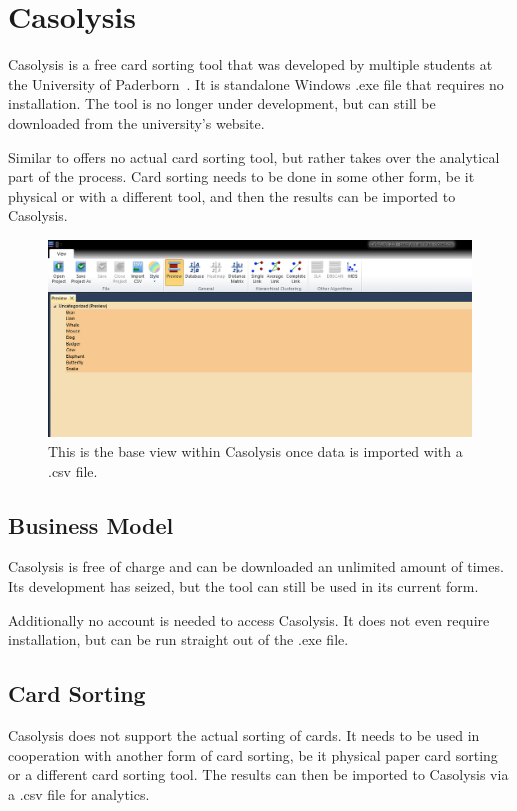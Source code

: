 \chapter{Casolysis}

\label{chap:Casolysis}

Casolysis is a free card sorting tool that was developed by multiple
students at the University of Paderborn~\parencite{Casolysis}. It is
standalone Windows .exe file that requires no installation. The tool 
is no longer under development, but can still be downloaded from the 
university's website.

Similar to \textcite{SynCaps}  offers no actual card sorting tool, but rather
takes over the analytical part of the process. Card sorting needs to
be done in some other form, be it physical or with a different tool,
and then the results can be imported to Casolysis.

\begin{figure}[tp] 
\centering
\includegraphics[keepaspectratio,width=\linewidth,height=\halfh]{images/casolysis-sorting.png}
\caption[Casolysis Application] { This is the base view within Casolysis
once data is imported with a .csv file.
 }
\label{fig:Casolysis1}
\end{figure}

\section{Business Model}
Casolysis is free of charge and can be downloaded an unlimited amount
of times. Its development has seized, but the tool can still be used
in its current form.

Additionally no account is needed to access Casolysis. It does
not even require installation, but can be run straight out of the .exe
file.

\section{Card Sorting}
Casolysis does not support the actual sorting of cards. It needs to be
used in cooperation with another form of card sorting, be it physical
paper card sorting or a different card sorting tool. The results can
then be imported to Casolysis via a .csv file for analytics.

